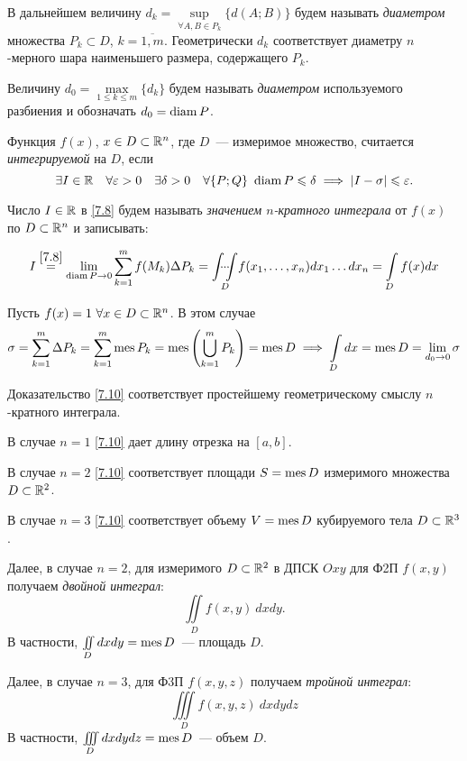 \documentclass[../../main.tex]{subfiles}
\begin{document}
В дальнейшем величину $d_k = \underset{\forall A, B \in 
P_k}\sup \{d(A; B)\}$
будем называть \emph{диаметром} множества $P_k \subset 
D$, $k = \overline{1, m}$. 
Геометрически $d_k$ соответствует диаметру $n$-мерного шара
наименьшего размера, содержащего $P_k$.

Величину ${d_0 = \underset{1 \le k \le m}\max \{d_k\}}$ 
будем называть \emph{диаметром} используемого разбиения и
обозначать $d_0 = \operatorname{diam} P$.

Функция $f(x)$, $x \in D \subset \mathbb{R}^n$, где $D$~--- измеримое
множество, считается \emph{интегрируемой} на $D$, если
\begin{equation}
\label{7.8}
\exists I \in \R \quad
\forall \eps > 0 \quad \exists \delta > 0 \quad 
\forall \{P; Q\} \ 
\diam P \le \delta \implies \abs{I  - \sigma} \le \eps.
\end{equation}

Число $ I \in \mathbb{R} $ в \eqref{7.8}
будем называть \emph{значением $n$-кратного интеграла} от 
$f(x)$ по $D \subset \mathbb{R}^n$ и записывать:

\begin{equation}
	I \stk{7.8} = \lim_{\diam P\to 0} \sum_{k=1}^m f(M_k) \Delta P_k
	= \underset{D}{\idotsint} f(x_1, \ldots, x_n) d x_1 \ldots dx_n =
	 \int\limits_{D}f(x)dx
\end{equation}


\begin{example}
	Пусть $f(x) = 1\ \forall x \in D \subset \mathbb{R}^n$. В этом случае
	\begin{equation}
	\label{7.10}
	\sigma = \sum\limits_{k = 1}^m\Delta{P_k} = 
	\sum\limits_{k=1}^m \operatorname{mes} P_k =
	\operatorname{mes}\left(\bigcup\limits_{k = 1}^m P_k\right) = \operatorname{mes} D
	\implies \int\limits_D dx = \operatorname{mes} D = \lim\limits_{d_0 \to 0} \sigma
	\end{equation}
	
	Доказательство \eqref{7.10} соответствует 
	простейшему геометрическому смыслу $n$-кратного 
	интеграла.
	
	В случае $n = 1$ \eqref{7.10} дает длину отрезка на $[a, b]$.
	
	В случае $n = 2$ \eqref{7.10} соответствует площади $S = \operatorname{mes} D$ 
	измеримого множества $D \subset \mathbb{R}^2$.
	
	В случае $n = 3$ \eqref{7.10} соответствует объему $V = \operatorname{mes} D$
	кубируемого тела $D \subset \mathbb{R}^3$.
	
	Далее, в случае $n=2$, для измеримого $D \subset \mathbb{R}^2$ в ДПСК 
	$Oxy$ для Ф2П $f(x, y)$ получаем \emph{двойной интеграл}:
	\[
		\iint\limits_D f(x, y)\:dxdy.
	\]
	В частности, $\iint\limits_D dxdy = \operatorname{mes} D$~--- площадь $D$.
	
	Далее, в случае $n=3$, для Ф3П $f(x, y, z)$ получаем 
	\emph{тройной интеграл}:
	\[
	\iiint\limits_D f(x,y,z)\:dxdydz
	\]
	В частности, $\iiint\limits_D dxdydz = \operatorname{mes} D$~--- объем $D$.
\end{example}
\end{document}
